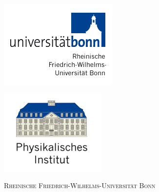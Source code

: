 \begin{titlepage}
  \thispagestyle{empty}
  \begin{center}

    \begin{minipage}{0.5\textwidth}
      \begin{flushleft}
	\includegraphics[width=.5\textwidth]{Figures/logoUNI.png}
      \end{flushleft}
    \end{minipage}%
    \begin{minipage}{0.5\textwidth}
      \begin{flushright}
	\includegraphics[width=.5\textwidth]{Figures/logoPI.png}
      \end{flushright}
    \end{minipage}
    
    \vspace{25 pt}
    
    \textsc{\LARGE Rheinische Friedrich-Wilhelms-Universität Bonn}\\[1.5 cm]
    
    \vspace{50 pt}
    

\end{center}
\end{titlepage}
